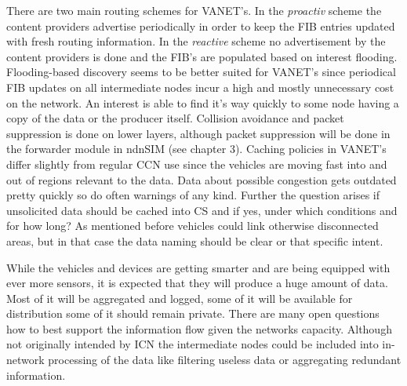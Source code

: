 There are two main routing schemes for VANET's. In the \emph{proactiv} scheme the content providers advertise periodically in order to keep the FIB entries updated with fresh routing information. In the \emph{reactive} scheme no advertisement by the content providers is done and the FIB's are populated based on interest flooding. Flooding-based discovery seems to be better suited for VANET's since periodical FIB updates on all intermediate nodes incur a high and mostly unnecessary cost on the network. An interest is able to find it's way quickly to some node having a copy of the data or the producer itself. Collision avoidance and packet suppression is done on lower layers, although packet suppression will be done in the forwarder module in ndnSIM (see chapter 3).
Caching policies in VANET's differ slightly from regular CCN use since the vehicles are moving fast into and out of regions relevant to the data. Data about possible congestion gets outdated pretty quickly so do often warnings of any kind. Further the question arises if unsolicited data should be cached into CS and if yes, under which conditions and for how long? As mentioned before vehicles could link otherwise disconnected areas, but in that case the data naming should be clear or that specific intent.

\vspace{5mm} %

While the vehicles and devices are getting smarter and are being equipped with ever more sensors, it is expected that they will produce a huge amount of data. Most of it will be aggregated and logged, some of it will be available for distribution some of it should remain private. There are many open questions how to best support the information flow given the networks capacity. Although not originally intended by ICN the intermediate nodes could be included into in-network processing of the data like filtering useless data or aggregating redundant information.








